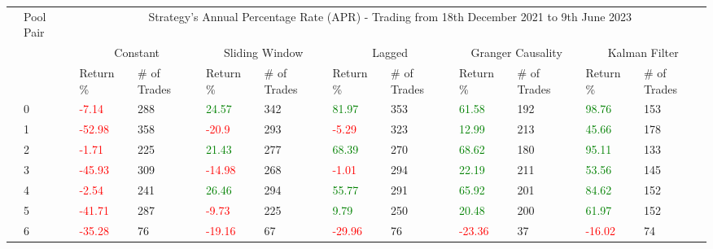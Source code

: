\begin{table}[H]
    \centering
    \begin{adjustwidth}{-0.8in}{-0.9in}
        \begin{tabular}{|p{2em}|p{2em}|p{3em}|p{3em}|p{3em}|p{3em}|p{3em}|p{3em}|p{3em}|p{3em}|p{3em}|p{3em}|}\hline
            & Pool Pair & \multicolumn{10}{|c|}{Strategy's Annual Percentage Rate (APR) - Trading from 18th December 2021 to 9th June 2023} \\\cline{3-12}
            &   & \multicolumn{2}{|c|}{Constant} & \multicolumn{2}{|c|}{Sliding Window} & \multicolumn{2}{|c|}{Lagged} & \multicolumn{2}{|c|}{Granger Causality} & \multicolumn{2}{|c|}{Kalman Filter}\\\cline{3-12}
            & & Return \% & \# of Trades & Return \% & \# of Trades & Return \% & \# of Trades & Return \% & \# of Trades & Return \% & \# of Trades\\\hline
            
            \parbox[t]{4em}{} & 0 & \textcolor{red}{-7.14} & 288 & \textcolor{green}{24.57} & 342 & \textcolor{green}{81.97} & 353 & \textcolor{green}{61.58} & 192 & \textcolor{green}{98.76} & 153\\
            & 1 & \textcolor{red}{-52.98} & 358 & \textcolor{red}{-20.9} & 293 & \textcolor{red}{-5.29} & 323 & \textcolor{green}{12.99} & 213 & \textcolor{green}{45.66} & 178\\
            & 2 & \textcolor{red}{-1.71} & 225 & \textcolor{green}{21.43} & 277 & \textcolor{green}{68.39} & 270 & \textcolor{green}{68.62} & 180 & \textcolor{green}{95.11} & 133\\
            & 3 & \textcolor{red}{-45.93} & 309 & \textcolor{red}{-14.98} & 268 & \textcolor{red}{-1.01} & 294 & \textcolor{green}{22.19} & 211 & \textcolor{green}{53.56} & 145\\
            & 4 & \textcolor{red}{-2.54} & 241 & \textcolor{green}{26.46} & 294 & \textcolor{green}{55.77} & 291 & \textcolor{green}{65.92} & 201 & \textcolor{green}{84.62} & 152\\
            & 5 & \textcolor{red}{-41.71} & 287 & \textcolor{red}{-9.73} & 225 & \textcolor{green}{9.79} & 250 & \textcolor{green}{20.48} & 200 & \textcolor{green}{61.97} & 152\\
            & 6 & \textcolor{red}{-35.28} & 76 & \textcolor{red}{-19.16} & 67 & \textcolor{red}{-29.96} & 76 & \textcolor{red}{-23.36} & 37 & \textcolor{red}{-16.02} & 74\\\hline\hline


\end{tabular}
\end{adjustwidth}
\end{table}
